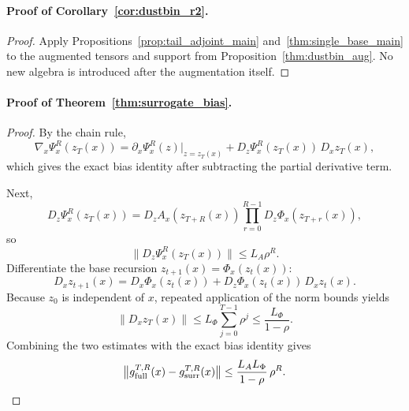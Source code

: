 \documentclass{article}
\begin{document}
\paragraph{Proof of Corollary~\ref{cor:dustbin_r2}.}
\begin{proof}
Apply Propositions~\ref{prop:tail_adjoint_main} and~\ref{thm:single_base_main} to the augmented tensors and support from Proposition~\ref{thm:dustbin_aug}. No new algebra is introduced after the augmentation itself.
\end{proof}

\paragraph{Proof of Theorem~\ref{thm:surrogate_bias}.}
\begin{proof}
By the chain rule,
\[
\nabla_x\Psi_x^R(z_T(x))
=
\partial_x \Psi_x^R(z)\big|_{z=z_T(x)}
+
D_z\Psi_x^R(z_T(x))\,D_x z_T(x),
\]
which gives the exact bias identity after subtracting the partial derivative term.

Next,
\[
D_z\Psi_x^R(z_T(x))
=
D_z A_x(z_{T+R}(x))
\prod_{r=0}^{R-1} D_z\Phi_x(z_{T+r}(x)),
\]
so
\[
\|D_z\Psi_x^R(z_T(x))\|
\le
L_A \rho^R.
\]
Differentiate the base recursion $z_{t+1}(x)=\Phi_x(z_t(x))$:
\[
D_x z_{t+1}(x)
=
D_x\Phi_x(z_t(x))
+
D_z\Phi_x(z_t(x))\,D_x z_t(x).
\]
Because $z_0$ is independent of $x$, repeated application of the norm bounds yields
\[
\|D_x z_T(x)\|
\le
L_\Phi \sum_{j=0}^{T-1}\rho^j
\le
\frac{L_\Phi}{1-\rho}.
\]
Combining the two estimates with the exact bias identity gives
\[
\bigl\|g_{\mathrm{full}}^{T,R}(x)-g_{\mathrm{surr}}^{T,R}(x)\bigr\|
\le
\frac{L_A L_\Phi}{1-\rho}\,\rho^R.
\qedhere
\]
\end{proof}
\end{document}
